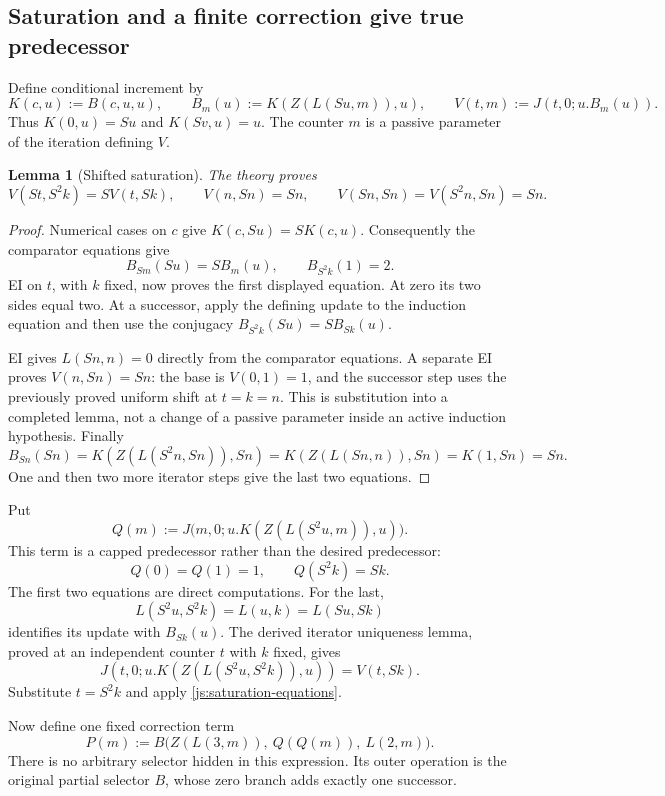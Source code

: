 \documentclass[11pt]{article}
\newtheorem{lemma}[theorem]{Lemma}
\theoremstyle{definition}
\begin{document}
\subsection{Saturation and a finite correction give true predecessor}

Define conditional increment by
\[
 K(c,u):=B(c,u,u),\qquad
 B_m(u):=K(Z(L(Su,m)),u),\qquad
 V(t,m):=J(t,0;u.B_m(u)).
\]
Thus $K(0,u)=Su$ and $K(Sv,u)=u$.  The counter $m$ is a passive
parameter of the iteration defining $V$.

\begin{lemma}[Shifted saturation]\label{js:saturation}
The theory proves
\[
 V(St,S^2k)=S V(t,Sk),\qquad
 V(n,Sn)=Sn,\qquad
 V(Sn,Sn)=V(S^2n,Sn)=Sn.
 \tag{Saturation}\label{js:saturation-equations}
\]
\end{lemma}
\begin{proof}
Numerical cases on $c$ give $K(c,Su)=S K(c,u)$.  Consequently
the comparator equations give
\[
 B_{Sm}(Su)=S B_m(u),\qquad B_{S^2k}(1)=2.
\]
EI on $t$, with $k$ fixed, now proves the first displayed equation.
At zero its two sides equal two.  At a successor, apply the defining
update to the induction equation and then use the conjugacy
$B_{S^2k}(Su)=S B_{Sk}(u)$.

EI gives $L(Sn,n)=0$ directly from the comparator equations.
A separate EI proves $V(n,Sn)=Sn$: the base is $V(0,1)=1$,
and the successor step uses the previously proved uniform shift at
$t=k=n$.  This is substitution into a completed lemma, not a change
of a passive parameter inside an active induction hypothesis.
Finally
\[
 B_{Sn}(Sn)=K(Z(L(S^2n,Sn)),Sn)
           =K(Z(L(Sn,n)),Sn)=K(1,Sn)=Sn.
\]
One and then two more iterator steps give the last two equations.
\end{proof}

Put
\[
 Q(m):=J\bigl(m,0;u.K(Z(L(S^2u,m)),u)\bigr).
\]
This term is a capped predecessor rather than the desired predecessor:
\[
 Q(0)=Q(1)=1,\qquad Q(S^2k)=Sk.
 \tag{Capped predecessor}\label{js:capped}
\]
The first two equations are direct computations.  For the last,
\[
 L(S^2u,S^2k)=L(u,k)=L(Su,Sk)
\]
identifies its update with $B_{Sk}(u)$.  The derived iterator uniqueness
lemma, proved at an independent counter $t$ with $k$ fixed, gives
\[
 J(t,0;u.K(Z(L(S^2u,S^2k)),u))=V(t,Sk).
\]
Substitute $t=S^2k$ and apply \eqref{js:saturation-equations}.

Now define one fixed correction term
\[
 \boxed{\quad
 P(m):=B\bigl(Z(L(3,m)),\ Q(Q(m)),\ L(2,m)\bigr).
 \quad}\tag{Predecessor}\label{js:predecessor}
\]
There is no arbitrary selector hidden in this expression.  Its outer
operation is the original partial selector $B$, whose zero branch adds
exactly one successor.
\end{document}
